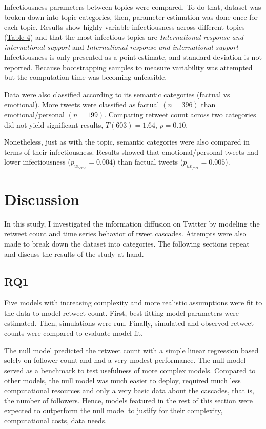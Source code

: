 \documentclass[11pt,a4paper]{article}
\begin{document}
        Infectiousness parameters between topics were compared. To do that, dataset was broken down into topic categories, then, parameter estimation was done once for each topic. Results show highly variable infectiousness across different topics (\hyperlink{fig:topic-dist}{Table 4}) and that the most infectious topics are \textit{International response and international support} and \textit{International response and international support} Infectiousness is only presented as a point estimate, and standard deviation is not reported. Because bootstrapping samples to measure variability was attempted but the computation time was becoming unfeasible.
        
        Data were also classified according to its semantic categories (factual vs emotional). More tweets were classified as factual $(n = 396)$ than emotional/personal $(n = 199)$. Comparing retweet count across two categories did not yield significant results, $T(603) = 1.64$, $p = 0.10$.

        Nonetheless, just as with the topic, semantic categories were also compared in terms of their infectiousness. Results showed that emotional/personal tweets had lower infectiousness ($p_{{uv}_{emo}} = 0.004$) than factual tweets ($p_{{uv}_{fact}} = 0.005$).
        
\clearpage
\section{Discussion}
    
    In this study, I investigated the information diffusion on Twitter by modeling the retweet count and time series behavior of tweet cascades. Attempts were also made to break down the dataset into categories. The following sections repeat and discuss the results of the study at hand.
    
    \subsection{RQ1}
    Five models with increasing complexity and more realistic assumptions were fit to the data to model retweet count. First, best fitting model parameters were estimated. Then, simulations were run. Finally, simulated and observed retweet counts were compared to evaluate model fit.
    
    The null model predicted the retweet count with a simple linear regression based solely on follower count and had a very modest performance. The null model served as a benchmark to test usefulness of more complex models. Compared to other models, the null model was much easier to deploy, required much less computational resources and only a very basic data about the cascades, that is, the number of followers. Hence, models featured in the rest of this section were expected to outperform the null model to justify for their complexity, computational costs, data needs.
    
\end{document}
